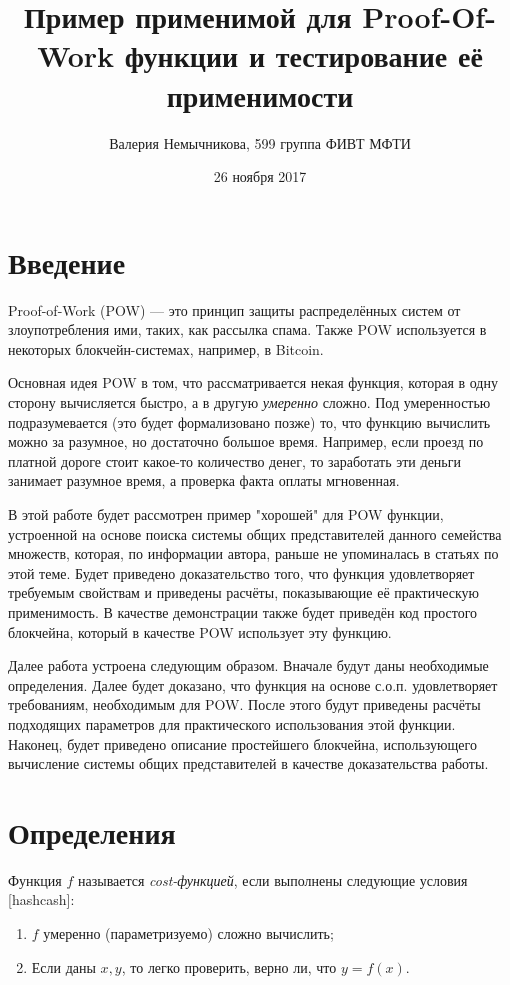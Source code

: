 \documentclass{article}
\title{Пример применимой для Proof-Of-Work функции и тестирование её применимости}
\date{26 ноября 2017}
\author{Валерия Немычникова, 599 группа ФИВТ МФТИ}
\begin{document}
\maketitle


\section{Введение}


    Proof-of-Work (POW) --- это принцип защиты распределённых систем от злоупотребления ими, таких, как рассылка спама. Также POW используется в некоторых блокчейн-системах, например, в Bitcoin.

    Основная идея POW в том, что рассматривается некая функция, которая в одну сторону вычисляется быстро, а в другую \textit{умеренно} сложно. Под умеренностью подразумевается (это будет формализовано позже) то, что функцию вычислить можно за разумное, но достаточно большое время. Например, если проезд по платной дороге стоит какое-то количество денег, то заработать эти деньги занимает разумное время, а проверка факта оплаты мгновенная.

    В этой работе будет рассмотрен пример "хорошей" для POW функции, устроенной на основе поиска системы общих представителей данного семейства множеств, которая, по информации автора, раньше не упоминалась в статьях по этой теме. Будет приведено доказательство того, что функция удовлетворяет требуемым свойствам и приведены расчёты, показывающие её практическую применимость. В качестве демонстрации также будет приведён код простого блокчейна, который в качестве POW использует эту функцию.

    Далее работа устроена следующим образом. Вначале будут даны необходимые определения. Далее будет доказано, что функция на основе с.о.п. удовлетворяет требованиям, необходимым для POW. После этого будут приведены расчёты подходящих параметров для практического использования этой функции. Наконец, будет приведено описание простейшего блокчейна, использующего вычисление системы общих представителей в качестве доказательства работы.
\section{Определения}

Функция $f$ называется \textit{cost-функцией}, если выполнены следующие условия [hashcash]:
\begin{enumerate}
\item $f$ умеренно (параметризуемо) сложно вычислить;
\item Если даны $x, y$, то легко проверить, верно ли, что $y = f(x)$.

\end{enumerate}
\end{document}

